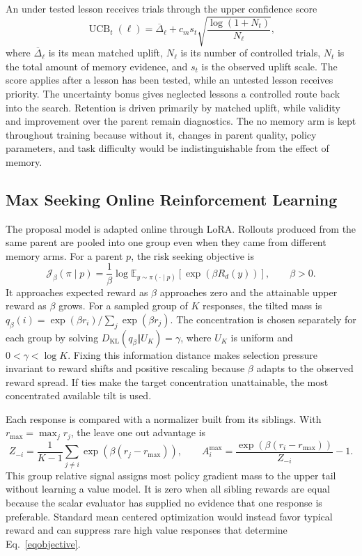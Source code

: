 \documentclass{article}
\begin{document}
An under tested lesson receives trials through the upper confidence score
\begin{equation}
\operatorname{UCB}_t(\ell)
=
\overline{\Delta}_\ell
+c_m s_t
\sqrt{\frac{\log(1+N_t)}{N_\ell}},
\label{equcb}
\end{equation}
where $\overline{\Delta}_\ell$ is its mean matched uplift, $N_\ell$ is its number of controlled trials, $N_t$ is the total amount of memory evidence, and $s_t$ is the observed uplift scale. The score applies after a lesson has been tested, while an untested lesson receives priority. The uncertainty bonus gives neglected lessons a controlled route back into the search. Retention is driven primarily by matched uplift, while validity and improvement over the parent remain diagnostics. The no memory arm is kept throughout training because without it, changes in parent quality, policy parameters, and task difficulty would be indistinguishable from the effect of memory.

\subsection{Max Seeking Online Reinforcement Learning}
\label{secrl}

The proposal model is adapted online through LoRA. Rollouts produced from the same parent are pooled into one group even when they came from different memory arms. For a parent $p$, the risk seeking objective is
\begin{equation}
\mathcal J_\beta(\pi\mid p)
=
\frac{1}{\beta}
\log
\mathbb E_{y\sim\pi(\cdot\mid p)}
\left[\exp\!\left(\beta R_d(y)\right)\right],
\qquad \beta>0.
\label{eqentropicobjective}
\end{equation}
It approaches expected reward as $\beta$ approaches zero and the attainable upper reward as $\beta$ grows. For a sampled group of $K$ responses, the tilted mass is $q_\beta(i)=\exp(\beta r_i)/\sum_j\exp(\beta r_j)$. The concentration is chosen separately for each group by solving $D_{\mathrm{KL}}(q_\beta\Vert U_K)=\gamma$, where $U_K$ is uniform and $0<\gamma<\log K$. Fixing this information distance makes selection pressure invariant to reward shifts and positive rescaling because $\beta$ adapts to the observed reward spread. If ties make the target concentration unattainable, the most concentrated available tilt is used.

Each response is compared with a normalizer built from its siblings. With $r_{\max}=\max_j r_j$, the leave one out advantage is
\begin{equation}
Z_{-i}
=
\frac{1}{K-1}
\sum_{j\ne i}
\exp\!\left(\beta(r_j-r_{\max})\right),
\qquad
A_i^{\max}
=
\frac{\exp\!\left(\beta(r_i-r_{\max})\right)}{Z_{-i}}-1.
\label{eqmaxadvantage}
\end{equation}
This group relative signal assigns most policy gradient mass to the upper tail without learning a value model. It is zero when all sibling rewards are equal because the scalar evaluator has supplied no evidence that one response is preferable. Standard mean centered optimization would instead favor typical reward and can suppress rare high value responses that determine Eq.~\eqref{eqobjective}.
\end{document}
